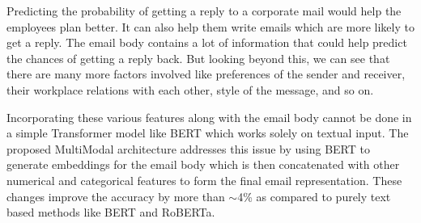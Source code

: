 Predicting the probability of getting a reply to a corporate mail would help the employees plan better. It can also help them write emails which are more likely to get a reply. The email body contains a lot of information that could help predict the chances of getting a reply back. But looking beyond this, we can see that there are many more factors involved like preferences of the sender and receiver, their workplace relations with each other, style of the message, and so on.

Incorporating these various features along with the email body cannot be done in a simple Transformer model like BERT which works solely on textual input. The proposed MultiModal architecture addresses this issue by using BERT to generate embeddings for the email body which is then concatenated with other numerical and categorical features to form the final email representation. These changes improve the accuracy by more than $\sim$4\% as compared to purely text based methods like BERT and RoBERTa.